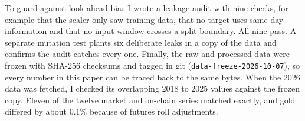 To guard against look-ahead bias I wrote a leakage audit with nine checks, for example that the scaler only saw training data, that no target uses same-day information and that no input window crosses a split boundary. All nine pass. A separate mutation test plants six deliberate leaks in a copy of the data and confirms the audit catches every one. Finally, the raw and processed data were frozen with SHA-256 checksums and tagged in git (\texttt{data-freeze-2026-10-07}), so every number in this paper can be traced back to the same bytes. When the 2026 data was fetched, I checked its overlapping 2018 to 2025 values against the frozen copy. Eleven of the twelve market and on-chain series matched exactly, and gold differed by about 0.1\% because of futures roll adjustments.
